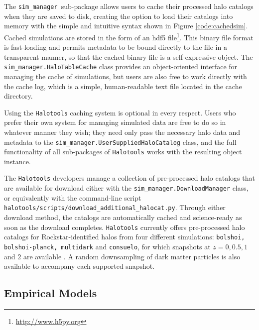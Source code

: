 \documentclass[twocolumn, tighten]{aastex6}
\newcommand{\sims}{{\tt sim\_manager }}
\begin{document}
The \sims sub-package allows users to cache their processed halo catalogs when they are saved to disk, creating the option to load their catalogs into memory with the simple and intuitive syntax shown in Figure \ref{code:cachedsim}. Cached simulations are stored in the form of an hdf5 file\footnote{\url{http://www.h5py.org}}\citep{hdf5}. This binary file format is fast-loading and permits metadata to be bound directly to the file in a transparent manner, so that the cached binary file is a self-expressive object. The {\tt sim\_manager.HaloTableCache} class provides an object-oriented interface for managing the cache of simulations, but users are also free to work directly with the cache log, which is a simple, human-readable text file located in the cache directory.

Using the {\tt Halotools} caching system is optional in every respect. Users who prefer their own system for managing simulated data are free to do so in whatever manner they wish; they need only pass the necessary halo data and metadata to the {\tt sim\_manager.UserSuppliedHaloCatalog} class, and the full functionality of all sub-packages of {\tt Halotools} works with the resulting object instance.

The {\tt Halotools} developers manage a collection of pre-processed halo catalogs that are available for download either with the {\tt sim\_manager.DownloadManager} class, or equivalently with the command-line script {\tt halotools/scripts/download\_additional\_halocat.py}. Through either download method, the catalogs are automatically cached and science-ready as soon as the download completes. {\tt Halotools} currently offers pre-processed halo catalogs for Rockstar-identified halos from four different simulations: {\tt bolshoi, bolshoi-planck, multidark} and {\tt consuelo}, for which snapshots at $z=0, 0.5, 1$ and $2$ are available \citep{gottloeber_klypin08, bolshoi_11, riebe_etal11, lasdamas}. A random downsampling of dark matter particles is also available to accompany each supported snapshot.

\subsection{Empirical Models}
\label{subsection:empirical_models}
\end{document}
